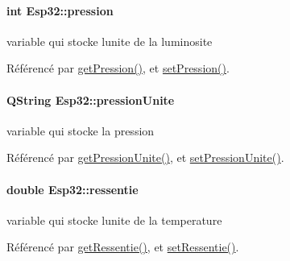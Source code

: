 \paragraph[{\texorpdfstring{pression}{pression}}]{\setlength{\rightskip}{0pt plus 5cm}int Esp32\+::pression\hspace{0.3cm}{\ttfamily [private]}}\hypertarget{class_esp32_a7ddfb5679b439b204a93f775cfa9d2fa}{}\label{class_esp32_a7ddfb5679b439b204a93f775cfa9d2fa}
variable qui stocke l\textquotesingle{}unite de la luminosite 

Référencé par \hyperlink{class_esp32_a31155a36108b37febae371d9ae65385a}{get\+Pression()}, et \hyperlink{class_esp32_a583358abbf0b279dabb5a2976f1783de}{set\+Pression()}.

\paragraph[{\texorpdfstring{pression\+Unite}{pressionUnite}}]{\setlength{\rightskip}{0pt plus 5cm}Q\+String Esp32\+::pression\+Unite\hspace{0.3cm}{\ttfamily [private]}}\hypertarget{class_esp32_aad1ead1e2c830025af0eebcdb30bcafe}{}\label{class_esp32_aad1ead1e2c830025af0eebcdb30bcafe}
variable qui stocke la pression 

Référencé par \hyperlink{class_esp32_a398d4a1cbc61f7af2f3af7ecbcf2f93f}{get\+Pression\+Unite()}, et \hyperlink{class_esp32_a3c6dd57f955aef0738c48be705538337}{set\+Pression\+Unite()}.

\paragraph[{\texorpdfstring{ressentie}{ressentie}}]{\setlength{\rightskip}{0pt plus 5cm}double Esp32\+::ressentie\hspace{0.3cm}{\ttfamily [private]}}\hypertarget{class_esp32_a08425470633629dae05f61659ff90375}{}\label{class_esp32_a08425470633629dae05f61659ff90375}
variable qui stocke l\textquotesingle{}unite de la temperature 

Référencé par \hyperlink{class_esp32_ae29854a5127d760a216f96ec7d797412}{get\+Ressentie()}, et \hyperlink{class_esp32_a85dc760b771c9233fa094a49679d9286}{set\+Ressentie()}.

